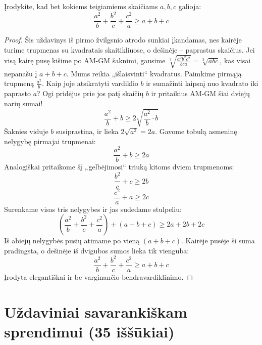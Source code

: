 \documentclass[11pt,a4paper]{scrartcl}
\begin{document}
\begin{example}
Įrodykite, kad bet kokiems teigiamiems skaičiams $a, b, c$ galioja:
$$ \frac{a^2}{b} + \frac{b^2}{c} + \frac{c^2}{a} \ge a + b + c $$
\end{example}
\begin{proof}
Šis uždavinys iš pirmo žvilgsnio atrodo sunkiai įkandamas, nes kairėje turime trupmenas su kvadratais skaitikliuose, o dešinėje – paprastus skaičius. Jei visą kairę pusę kišime po AM-GM šaknimi, gausime $\sqrt[3]{\frac{a^2b^2c^2}{bca}} = \sqrt[3]{abc}$, kas visai nepanašu į $a+b+c$. Mums reikia „išlaisvinti“ kvadratus.
Paimkime pirmąją trupmeną $\frac{a^2}{b}$. Kaip joje atsikratyti vardiklio $b$ ir sumažinti laipsnį nuo kvadrato iki paprasto $a$? Ogi pridėjus prie jos patį skaičių $b$ ir pritaikius AM-GM šiai dviejų narių sumai!
$$ \frac{a^2}{b} + b \ge 2\sqrt{\frac{a^2}{b} \cdot b} $$
Šaknies viduje $b$ susiprastina, ir lieka $2\sqrt{a^2} = 2a$.
Gavome tobulą asmeninę nelygybę pirmajai trupmenai:
$$ \frac{a^2}{b} + b \ge 2a $$
Analogiškai pritaikome šį „gelbėjimosi“ triuką kitoms dviem trupmenoms:
$$ \frac{b^2}{c} + c \ge 2b $$
$$ \frac{c^2}{a} + a \ge 2c $$
Surenkame visas tris nelygybes ir jas sudedame stulpeliu:
$$ \left(\frac{a^2}{b} + \frac{b^2}{c} + \frac{c^2}{a}\right) + (a + b + c) \ge 2a + 2b + 2c $$
Iš abiejų nelygybės pusių atimame po vieną $(a+b+c)$. Kairėje pusėje ši suma pradingsta, o dešinėje iš dvigubos sumos lieka tik vienguba:
$$ \frac{a^2}{b} + \frac{b^2}{c} + \frac{c^2}{a} \ge a + b + c $$
Įrodyta elegantiškai ir be varginančio bendravardiklinimo.
\end{proof}

\vspace{0.5cm}

\newpage
\section{Uždaviniai savarankiškam sprendimui (35 iššūkiai)}
\end{document}
